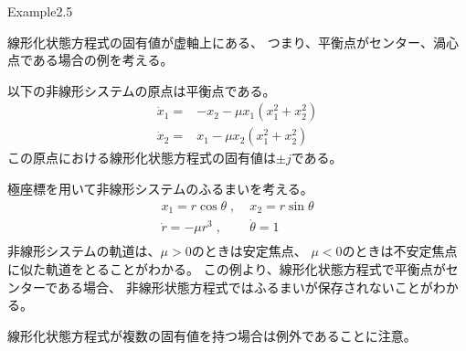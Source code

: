 \documentclass{jsarticle}
\begin{document}
Example2.5

線形化状態方程式の固有値が虚軸上にある、
つまり、平衡点がセンター、渦心点である場合の例を考える。

以下の非線形システムの原点は平衡点である。
\begin{align*}
  \dot x_1 =& -x_2-\mu x_1 (x_1^2 + x_2^2)\\
  \dot x_2 =& x_1-\mu x_2(x_1^2 + x_2^2)
\end{align*}
この原点における線形化状態方程式の固有値は$\pm j$である。

極座標を用いて非線形システムのふるまいを考える。
\begin{align*}
  x_1 = r\cos \theta \;,&\; x_2 = r\sin\theta\\
  \dot r = -\mu r^3 \;,&\;\dot \theta = 1\\
\end{align*}
非線形システムの軌道は、$\mu>0$のときは安定焦点、
$\mu < 0$のときは不安定焦点に似た軌道をとることがわかる。
この例より、線形化状態方程式で平衡点がセンターである場合、
非線形状態方程式ではふるまいが保存されないことがわかる。

線形化状態方程式が複数の固有値を持つ場合は例外であることに注意。
\end{document}
